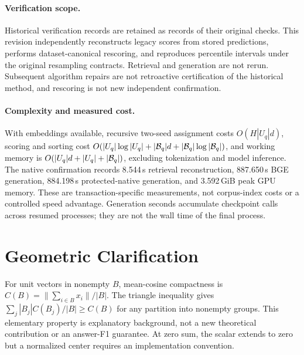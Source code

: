 \documentclass[11pt]{article}
\begin{document}
\paragraph{Verification scope.}
Historical verification records are retained as records of their original
checks. This revision independently reconstructs legacy scores from stored
predictions, performs dataset-canonical rescoring, and reproduces percentile
intervals under the original resampling contracts. Retrieval and generation
are not rerun. Subsequent algorithm repairs are not retroactive certification
of the historical method, and rescoring is not new independent confirmation.

\paragraph{Complexity and measured cost.}
With embeddings available, recursive two-seed assignment costs
$O(H|U_q|d)$, scoring and sorting cost
$O(|U_q|\log|U_q|+|{\cal B}_q|d+|{\cal B}_q|\log|{\cal B}_q|)$,
and working memory is $O(|U_q|d+|U_q|+|{\cal B}_q|)$, excluding tokenization
and model inference. The native confirmation records 8.544\,s retrieval
reconstruction, 887.650\,s BGE generation, 884.198\,s protected-native
generation, and 3.592\,GiB peak GPU memory. These are transaction-specific
measurements, not corpus-index costs or a controlled speed advantage.
Generation seconds accumulate checkpoint calls across resumed processes;
they are not the wall time of the final process.

\section{Geometric Clarification}
\label{app:geometry}
For unit vectors in nonempty $B$, mean-cosine compactness is
$C(B)=\|\sum_{i\in B}x_i\|/|B|$. The triangle inequality gives
$\sum_j |B_j|C(B_j)/|B|\geq C(B)$ for any partition into nonempty groups.
This elementary property is explanatory background, not a new theoretical
contribution or an answer-F1 guarantee. At zero sum, the scalar extends to
zero but a normalized center requires an implementation convention.


\end{document}
